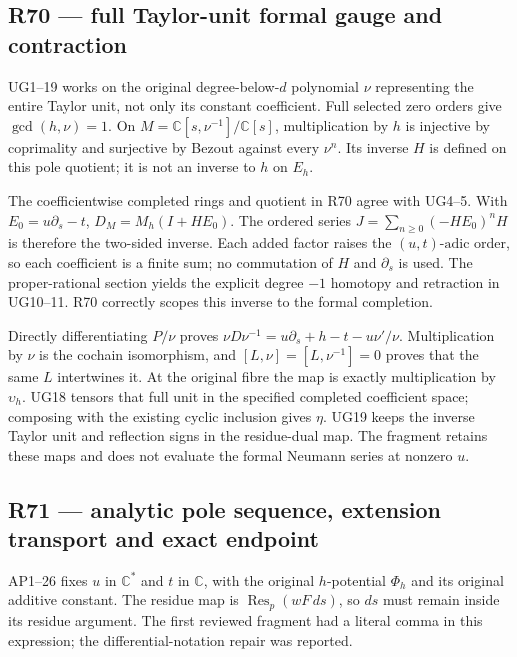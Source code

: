 \subsection{R70 --- full Taylor-unit formal gauge and
contraction}\label{r70-full-taylor-unit-formal-gauge-and-contraction}

UG1--19 works on the original degree-below-\(d\) polynomial \(\nu\)
representing the entire Taylor unit, not only its constant coefficient.
Full selected zero orders give \(\gcd(h,\nu)=1\). On
\(M=\mathbb C[s,\nu^{-1}]/\mathbb C[s]\), multiplication by \(h\) is
injective by coprimality and surjective by Bezout against every
\(\nu^n\). Its inverse \(H\) is defined on this pole quotient; it is not
an inverse to \(h\) on \(E_h\).

The coefficientwise completed rings and quotient in R70 agree with
UG4--5. With \(E_0=u\partial_s-t\), \(D_M=M_h(I+HE_0)\). The ordered
series \(J=\sum_{n\geq0}(-HE_0)^nH\) is therefore the two-sided inverse.
Each added factor raises the \((u,t)\text{-adic}\) order, so each
coefficient is a finite sum; no commutation of \(H\) and \(\partial_s\)
is used. The proper-rational section yields the explicit degree \(-1\)
homotopy and retraction in UG10--11. R70 correctly scopes this inverse
to the formal completion.

Directly differentiating \(P/\nu\) proves
\(\nu D\nu^{-1}=u\partial_s+h-t-u\nu'/\nu\). Multiplication by \(\nu\)
is the cochain isomorphism, and \([L,\nu]=[L,\nu^{-1}]=0\) proves that
the same \(L\) intertwines it. At the original fibre the map is exactly
multiplication by \(\upsilon_h\). UG18 tensors that full unit in the
specified completed coefficient space; composing with the existing
cyclic inclusion gives \(\eta\). UG19 keeps the inverse Taylor unit and
reflection signs in the residue-dual map. The fragment retains these
maps and does not evaluate the formal Neumann series at nonzero \(u\).

\subsection{R71 --- analytic pole sequence, extension transport and
exact
endpoint}\label{r71-analytic-pole-sequence-extension-transport-and-exact-endpoint}

AP1--26 fixes \(u\) in \(\mathbb C^*\) and \(t\) in \(\mathbb C\), with
the original \(h\)-potential \(\Phi_h\) and its original additive
constant. The residue map is \(\operatorname{Res}_p(wF\,ds)\), so \(ds\)
must remain inside its residue argument. The first reviewed fragment had
a literal comma in this expression; the differential-notation repair was
reported.

